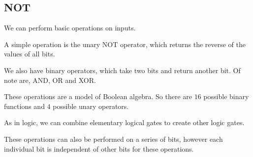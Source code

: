 
\subsection{NOT}

We can perform basic operations on inputs.

A simple operation is the unary NOT operator, which returns the reverse of the values of all bits.

We also have binary operators, which take two bits and return another bit. Of note are, AND, OR and XOR.

These operations are a model of Boolean algebra. So there are \(16\) possible binary functions and \(4\) possible unary operators.

As in logic, we can combine elementary logical gates to create other logic gates.

These operations can also be performed on a series of bits, however each individual bit is independent of other bits for these operations.

